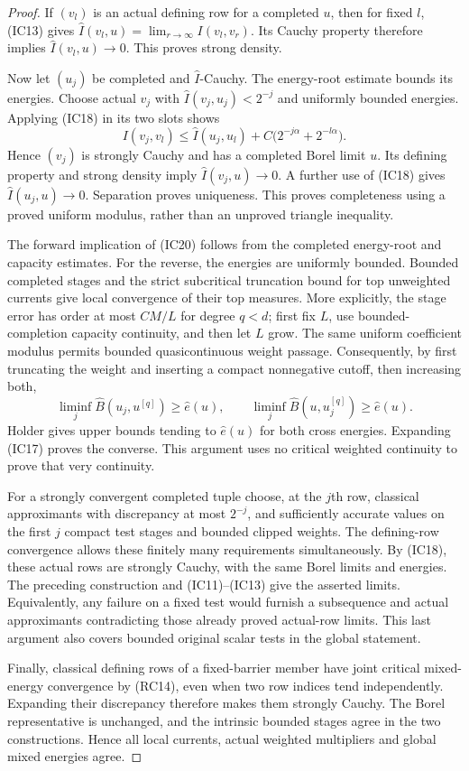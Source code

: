 \documentclass[11pt,a4paper]{article}
\numberwithin{equation}{section}
\theoremstyle{definition}
\theoremstyle{remark}
\begin{document}
\begin{proof}
If $(v_l)$ is an actual defining row for a completed $u$, then
for fixed $l$, (IC13) gives
$\widehat I(v_l,u)=\lim_{r\to\infty}I(v_l,v_r)$.
Its Cauchy property therefore implies
$\widehat I(v_l,u)\to0$. This proves strong density.

Now let $(u_j)$ be completed and $\widehat I$-Cauchy.
The energy-root estimate bounds its energies. Choose actual
$v_j$ with $\widehat I(v_j,u_j)<2^{-j}$ and uniformly bounded
energies. Applying (IC18) in its two slots shows
\[
 I(v_j,v_l)\leq\widehat I(u_j,u_l)
                   +C\bigl(2^{-j\alpha}+2^{-l\alpha}\bigr).
 \tag{IC21}
\]
Hence $(v_j)$ is strongly Cauchy and has a completed Borel
limit $u$. Its defining property and strong density imply
$\widehat I(v_j,u)\to0$. A further use of (IC18) gives
$\widehat I(u_j,u)\to0$. Separation proves uniqueness.
This proves completeness using a proved uniform modulus,
rather than an unproved triangle inequality.

The forward implication of (IC20) follows from the completed
energy-root and capacity estimates. For the reverse, the
energies are uniformly bounded. Bounded completed stages and
the strict subcritical truncation bound for top unweighted
currents give local convergence of their top measures. More
explicitly, the stage error has order at most $C M/L$ for
degree $q<d$; first fix $L$, use bounded-completion capacity
continuity, and then let $L$ grow. The same uniform coefficient
modulus permits bounded quasicontinuous weight passage.
Consequently, by first truncating the weight and inserting a
compact nonnegative cutoff, then increasing both,
\[
 \liminf_j\widehat B(u_j,u^{[q]})\geq\widehat e(u),\qquad
 \liminf_j\widehat B(u,u_j^{[q]})\geq\widehat e(u).
 \tag{IC22}
\]
Holder gives upper bounds tending to $\widehat e(u)$ for
both cross energies. Expanding (IC17) proves the converse.
This argument uses no critical weighted continuity to prove
that very continuity.

For a strongly convergent completed tuple choose, at the $j$th
row, classical approximants with discrepancy at most $2^{-j}$,
and sufficiently accurate values on the first $j$ compact
test stages and bounded clipped weights. The defining-row
convergence allows these finitely many requirements
simultaneously. By (IC18), these actual rows are strongly
Cauchy, with the same Borel limits and energies. The preceding
construction and (IC11)--(IC13) give the asserted limits.
Equivalently, any failure on a fixed test would furnish a
subsequence and actual approximants contradicting those
already proved actual-row limits. This last argument also
covers bounded original scalar tests in the global statement.

Finally, classical defining rows of a fixed-barrier member
have joint critical mixed-energy convergence by (RC14), even
when two row indices tend independently. Expanding their
discrepancy therefore makes them strongly Cauchy. The Borel
representative is unchanged, and the intrinsic bounded stages
agree in the two constructions. Hence all local currents,
actual weighted multipliers and global mixed energies agree.
\end{proof}
\end{document}
